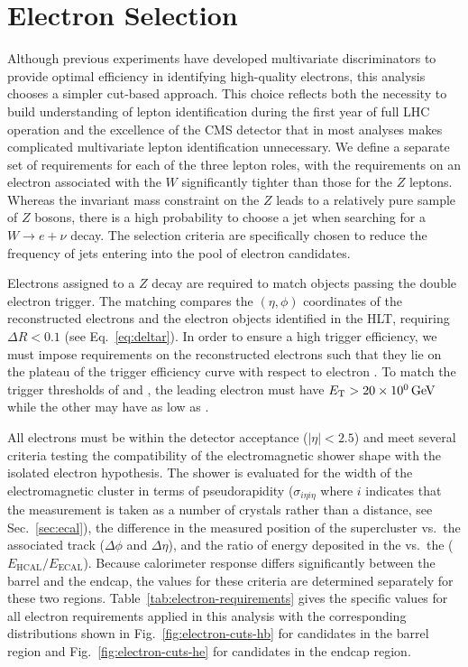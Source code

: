 \section{Electron Selection}
\label{sec:electron-selection}
Although previous experiments have developed multivariate discriminators to provide optimal efficiency in identifying high-quality electrons, this analysis chooses a simpler cut-based approach.  This choice reflects both the necessity to build understanding of lepton identification during the first year of full LHC operation and the excellence of the CMS detector that in most analyses makes complicated multivariate lepton identification unnecessary.  We define a separate set of requirements for each of the three lepton roles, with the requirements on an electron associated with the $W$ significantly tighter than those for the $Z$ leptons.  Whereas the invariant mass constraint on the $Z$ leads to a relatively pure sample of $Z$ bosons, there is a high probability to choose a jet when searching for a $W \to e + \nu$ decay.  The selection criteria are specifically chosen to reduce the frequency of jets entering into the pool of electron candidates.

Electrons assigned to a $Z$ decay are required to match objects passing the double electron trigger.  The matching compares the $(\eta, \phi)$ coordinates of the reconstructed electrons and the electron objects identified in the HLT, requiring $\Delta R < 0.1$ (see Eq.~\ref{eq:deltar}).  In order to ensure a high trigger efficiency, we must impose \et requirements on the reconstructed electrons such that they lie on the plateau of the trigger efficiency curve with respect to electron \et.  To match the trigger thresholds of  and , the leading electron must have $\et > \sienergy{20}$ while the other may have \et as low as .

All electrons must be within the detector acceptance ($|\eta| < 2.5$) and meet several criteria testing the compatibility of the electromagnetic shower shape with the isolated electron hypothesis.  The shower is evaluated for the width of the electromagnetic cluster in terms of pseudorapidity ($\sigma_{i\eta i\eta}$ where $i$ indicates that the measurement is taken as a number of crystals rather than a distance, see Sec.~\ref{sec:ecal}), the difference in the measured position of the \ecal supercluster vs.\ the associated track ($\Delta\phi$ and $\Delta\eta$), and the ratio of energy deposited in the \ecal vs.\ the \hcal ($E_\text{HCAL} / E_\text{ECAL}$).  Because calorimeter response differs significantly between the barrel and the endcap, the values for these criteria are determined separately for these two regions.  Table~\ref{tab:electron-requirements} gives the specific values for all electron requirements applied in this analysis with the corresponding distributions shown in Fig.~\ref{fig:electron-cuts-hb} for candidates in the barrel region and Fig.~\ref{fig:electron-cuts-he} for candidates in the endcap region.


